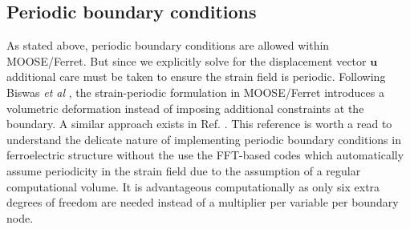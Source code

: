 \documentclass[paper=a4,14pt]{scrartcl} %
\begin{document}
%
\subsection*{Periodic boundary conditions}
%
As stated above, periodic boundary conditions are allowed within MOOSE/Ferret. But since we explicitly solve for the displacement vector $\textbf{u}$ additional care must be taken to ensure the strain field is periodic.
%
Following Biswas \emph{et al} \cite{Biswas2020}, the strain-periodic formulation in MOOSE/Ferret introduces a volumetric deformation instead of imposing additional constraints at the boundary. 
%
A similar approach exists in Ref. \cite{Muench2019}. This reference is worth a read to understand the delicate nature of implementing periodic boundary conditions in ferroelectric structure without the use the FFT-based codes which automatically assume periodicity in the strain field due to the assumption of a regular computational volume.
%
It is advantageous computationally as only six extra degrees of freedom are needed instead of a multiplier per variable per boundary node.
%
\end{document}
